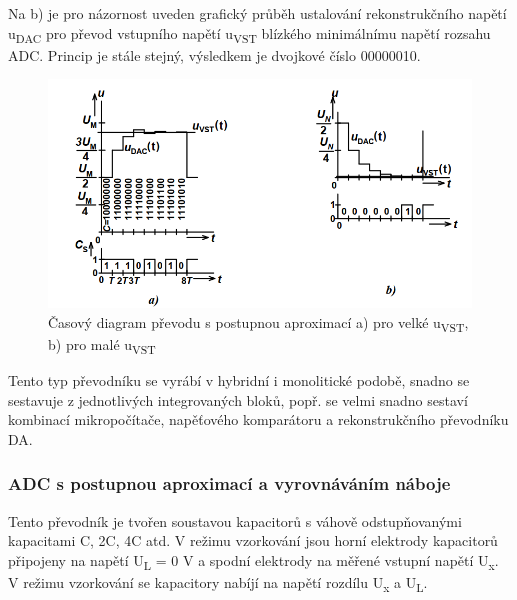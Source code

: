 Na b) je pro názornost uveden grafický průběh ustalování rekonstrukčního napětí u\textsubscript{DAC} pro převod vstupního napětí u\textsubscript{VST} blízkého minimálnímu napětí rozsahu ADC. Princip je stále stejný, výsledkem je dvojkové číslo 00000010.
\begin{figure}[h]
   \begin{center}
     \includegraphics[scale=0.6]{images/dia.png}
   \end{center}
   \caption{Časový diagram převodu s postupnou aproximací a) pro velké u\textsubscript{VST}, b) pro malé
u\textsubscript{VST}}
\end{figure}

Tento typ převodníku se vyrábí v hybridní i monolitické podobě, snadno se sestavuje z jednotlivých integrovaných bloků, popř. se velmi snadno sestaví kombinací mikropočítače, napěťového komparátoru a rekonstrukčního převodníku DA.

\subsubsection{ADC s postupnou aproximací a vyrovnáváním náboje}
Tento převodník je tvořen soustavou kapacitorů s váhově odstupňovanými kapacitami C, 2C, 4C atd. V režimu vzorkování jsou horní elektrody kapacitorů připojeny na napětí U\textsubscript{L} = 0 V a spodní elektrody na měřené vstupní napětí U\textsubscript{x}. V režimu vzorkování se kapacitory nabíjí na napětí rozdílu U\textsubscript{x} a U\textsubscript{L}.

